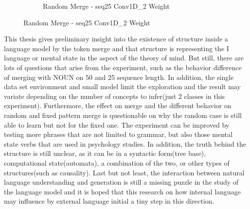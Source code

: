 \documentclass[12pt]{article}
\renewcommand{\refname}{Viidatud kirjandus}%
\begin{document}
\begin{figure} [!h]
\begin{subfigure}[h]{0.3\linewidth}
\caption{Random Merge - seq25 Conv1D\_2 Weight}
\label{fig:modelWeight}
\end{subfigure}
\end{figure}

This thesis gives preliminary insight into the existence of structure inside a language model by the token merge and that structure is representing the I language or mental state in the aspect of the theory of mind. But still, there are lots of questions that arise from the experiment, such as the behavior difference of merging with NOUN on 50 and 25 sequence length. In addition, the single data set environment and small model limit the exploration and the result may variate depending on the number of concepts to infer(just 2 classes in this experiment). Furthermore, the effect on merge and the different behavior on random and fixed pattern merge is questionable on why the random case is still able to learn but not for the fixed one. The experiment can be improved by testing more phrases that are not limited to grammar, but also those mental state verbs that are used in psychology studies. In addition, the truth behind the structure is still unclear, as it can be in a syntactic form(tree base), computational state(automata), a combination of the two, or other types of structures(such as causality). Last but not least, the interaction between natural language understanding and generation is still a missing puzzle in the study of the language model and it is hoped that this research on how internal language may influence by external language initial a tiny step in this direction.



\addcontentsline{toc}{section}{\refname}

\end{document}
